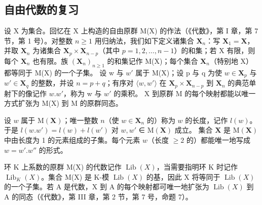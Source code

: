 \subsection{自由代数的复习}

设 X 为集合。回忆在 X 上构造的自由原群 M(X) 的作法（《代数》，第 I 章，第 7 节，第 1 号）。对整数 \(n \geqslant 1\) 用归纳法，我们如下定义诸集合 \(\mathbf{X}_n\)：写 \(\mathbf{X}_1 = \mathbf{X}\)，并取 \(\mathbf{X}_n\) 为诸集合 \(\mathbf{X}_p \times \mathbf{X}_{n-p}\)（其中 \(p = 1, 2, \ldots, n-1\)）的和集；若 X 有限，则每个 \(\mathbf{X}_n\) 也有限。族 \((\mathbf{X}_n)_{n \geqslant 1}\) 的和集记作 M(X)；每个集合 \(\mathbf{X}_n\)（特别地 X）都等同于 M(X) 的一个子集。 设 w 与 \(w'\) 属于 M(X)；设 p 与 q 为使 \(w \in \mathbf{X}_p\) 与 \(w' \in \mathbf{X}_q\) 的整数，并设 \(n = p + q\)；有序对 \(\langle w, w' \rangle\) 在 \(\mathbf{X}_p \times \mathbf{X}_{n-p}\) 到 \(\mathbf{X}_n\) 的典范单射下的像记作 \(w.w'\)，称为 w 与 \(w'\) 的乘积。 X 到原群 M 的每个映射都能以唯一方式扩张为 M(X) 到 M 的原群同态。

设 \(w\) 属于 \(\mathrm{M}(\mathbf{X})\)；唯一整数 \(n\)（使 \(w \in \mathbf{X}_n\) 的）称为 \(w\) 的长度，记作 \(l(w)\)。于是 \(l(w.w') = l(w) + l(w')\) 对 \(w, w'\) ∈ \(\mathrm{M}(\mathbf{X})\) 成立。 集合 \(\mathbf{X}\) 是 \(\mathrm{M}(\mathbf{X})\) 中由长度为 1 的元素组成的子集。每个元素 \(w\)（长度 \(\geqslant 2\) 的）都能唯一地写成 \(w = w'.w''\) 的形式。

环 K 上系数的原群 M(X) 的代数记作 \(\operatorname{Lib}(X)\)，当需要指明环 K 时记作 \(\operatorname{Lib}_{K}(X)\)。集合 M(X) 是 K-模 \(\operatorname{Lib}(X)\) 的基，因此 X 将等同于 \(\operatorname{Lib}(X)\) 的一个子集。若 A 是代数，X 到 A 的每个映射都可唯一地扩张为 \(\operatorname{Lib}(X)\) 到 A 的同态（《代数》，第 III 章，第 2 节，第 7 号，命题 7）。


